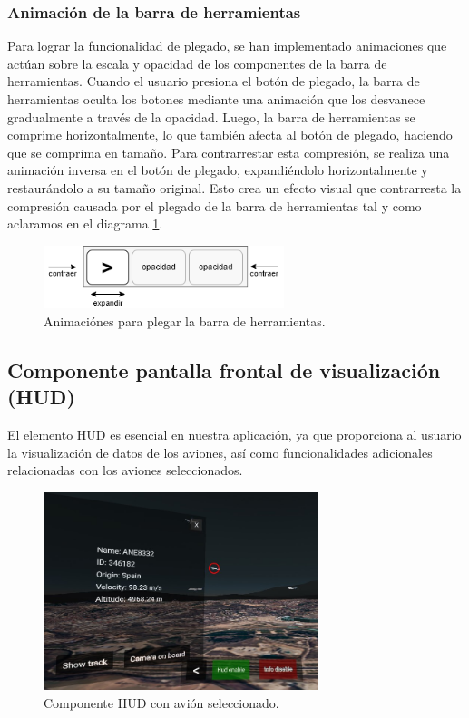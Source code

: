 \documentclass[a4paper, 11pt]{book}
\begin{document}
\subsubsection{Animación de la barra de herramientas}
\label{subsec:animationToolbar}
Para lograr la funcionalidad de plegado, se han implementado animaciones que actúan sobre la escala y opacidad de los componentes de la barra de herramientas. Cuando el usuario presiona el botón de plegado, la barra de herramientas oculta los botones mediante una animación que los desvanece gradualmente a través de la opacidad. Luego, la barra de herramientas se comprime horizontalmente, lo que también afecta al botón de plegado, haciendo que se comprima en tamaño.
Para contrarrestar esta compresión, se realiza una animación inversa en el botón de plegado, expandiéndolo horizontalmente y restaurándolo a su tamaño original. Esto crea un efecto visual que contrarresta la compresión causada por el plegado de la barra de herramientas tal y como aclaramos en el diagrama \ref{fig:animationPlegado}.
\begin{figure}[h]
  \centering
  \includegraphics[width=7cm, keepaspectratio]{img/plegadoToolbar.drawio.png}
  \caption{Animaciónes para plegar la barra de herramientas.}
  \label{fig:animationPlegado}
\end{figure}
\subsection{Componente pantalla frontal de visualización (HUD)}
\label{subsec:hud}
El elemento \textsc{\gls{HUD}} es esencial en nuestra aplicación, ya que proporciona al usuario la visualización de datos de los aviones, así como funcionalidades adicionales relacionadas con los aviones seleccionados.
\begin{figure}[h]
  \centering
  \includegraphics[width=8cm, keepaspectratio]{img/hud.jpg}
  \caption{Componente \textsc{HUD} con avión seleccionado.}
  \label{fig:hud}
\end{figure}
\end{document}
